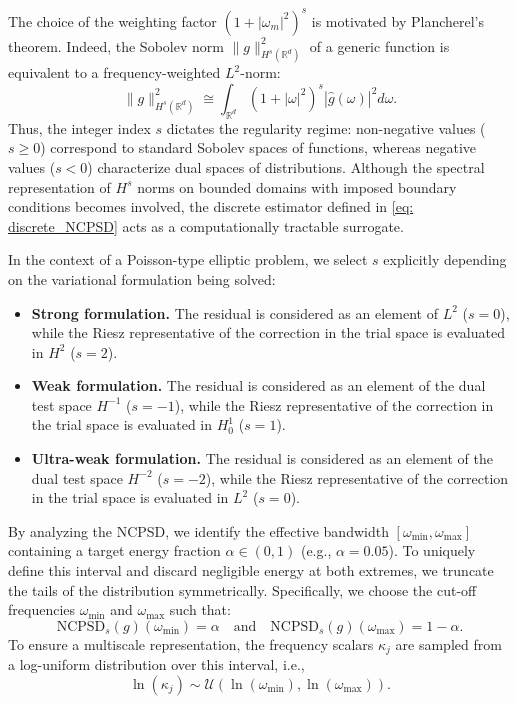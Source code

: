 \documentclass{article}
\theoremstyle{definition}
\begin{document}
The choice of the weighting factor $(1 + |\omega_m|^2)^s$ is motivated by Plancherel's theorem. Indeed, the Sobolev norm $\|g\|_{H^s(\mathbb{R}^d)}^2$ of a generic function is equivalent to a frequency-weighted $L^2$-norm:
\begin{equation}\label{eq: continuous_plancherel}
    \|g\|_{H^s(\mathbb{R}^d)}^2 \cong \int_{\mathbb{R}^d }(1+|\omega|^2)^s |\hat{g}(\omega)|^2 d\omega.
\end{equation}
Thus, the integer index $s$ dictates the regularity regime: non-negative values ($s \geq 0$) correspond to standard Sobolev spaces of functions, whereas negative values ($s < 0$) characterize dual spaces of distributions. Although the spectral representation of $H^s$ norms on bounded domains with imposed boundary conditions becomes involved, the discrete estimator defined in \eqref{eq: discrete_NCPSD} acts as a computationally tractable surrogate. {In the context of a Poisson-type elliptic problem, we select $s$ explicitly depending on the variational formulation being solved:
\begin{itemize}
    \item \textbf{Strong formulation.} The residual is considered as an element of $L^2$ ($s=0$), while the Riesz representative of the correction in the trial space is evaluated in $H^2$ ($s=2$).
    \item \textbf{Weak formulation.} The residual is considered as an element of the dual test space $H^{-1}$ ($s=-1$), while the Riesz representative of the correction in the trial space is evaluated in $H^1_0$ ($s=1$).
    \item \textbf{Ultra-weak formulation.} The residual is considered as an element of the dual test space $H^{-2}$ ($s=-2$), while the Riesz representative of the correction in the trial space is evaluated in $L^2$ ($s=0$).
\end{itemize}
}
By analyzing the NCPSD, we identify the effective bandwidth $[\omega_{\min}, \omega_{\max}]$ containing a target energy fraction $\alpha \in (0,1)$ (e.g., $\alpha = 0.05$). To uniquely define this interval and discard negligible energy at both extremes, we truncate the tails of the distribution symmetrically. Specifically, we choose the cut-off frequencies $\omega_{\min}$ and $\omega_{\max}$ such that:
\begin{equation}
    \text{NCPSD}_s(g)(\omega_{\min}) = \alpha \quad \text{and} \quad \text{NCPSD}_s(g)(\omega_{\max}) = 1-\alpha.
\end{equation} 
To ensure a multiscale representation, the frequency scalars $\kappa_j$ are sampled from a log-uniform distribution over this interval, i.e.,
\begin{equation}
    \ln(\kappa_j) \sim \mathcal{U}(\ln(\omega_{\min}), \ln(\omega_{\max})).
\end{equation}
\end{document}
